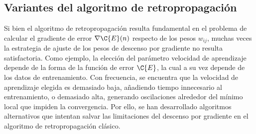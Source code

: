%
\subsection{Variantes del algoritmo de retropropagación}
%
Si bien el algoritmo de retropropagación resulta fundamental en el
problema de calcular el gradiente de error $\nabla{\C{E}(n)}$ respecto
de los pesos $w_{ij}$, muchas veces la estrategia de ajuste de los
pesos de descenso por gradiente no resulta satisfactoria.  Como
ejemplo, la elección del parámetro velocidad de aprendizaje depende de
la forma de la función de error $\C{E}$, la cual a su vez depende de
los datos de entrenamiento.  Con frecuencia, se encuentra que la
velocidad de aprendizaje elegida es demasiado baja, añadiendo tiempo
innecesario al entrenamiento, o demasiado alta, generando oscilaciones
alrededor del mínimo local que impiden la convergencia.  Por ello, se
han desarrollado algoritmos alternativos que intentan salvar las
limitaciones del descenso por gradiente en el algoritmo de
retropropagación clásico.
